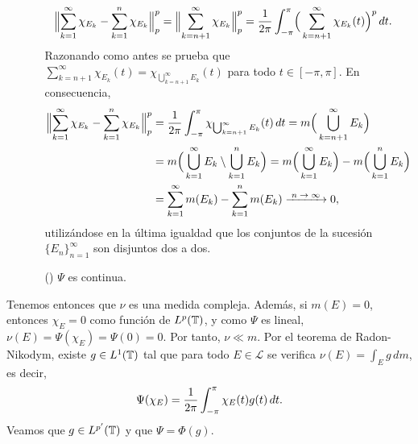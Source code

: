 \documentclass[a4paper, 12pt, oneside]{book}
\begin{document}
\begin{itemize}
\begin{itemize}
        \[
        \begin{aligned}[t]
            \Bigl\|\sum_{k=1}^\infty \chi_{E_k} - \sum_{k=1}^n \chi_{E_k}\Bigr\|_p^p &= \Bigl\|\sum_{k=n+1}^\infty \chi_{E_k}\Bigr\|_p^p = \frac{1}{2\pi}\int_{-\pi}^{\pi} \Bigl(\,\sum_{k=n+1}^\infty\chi_{E_k}(t)\Bigr)^p \, dt.
        \end{aligned}
        \]
        Razonando como antes se prueba que $\sum_{k=n+1}^\infty \chi_{E_k}(t) = \chi_{\bigcup_{k=n+1}^\infty E_k}(t)$ para todo $t \in [-\pi,\pi]$. En consecuencia,
        \[
        \begin{aligned}[t]
            \Bigl\|\sum_{k=1}^\infty \chi_{E_k} - \sum_{k=1}^n \chi_{E_k}\Bigr\|_p^p &= \frac{1}{2\pi}\integral{-\pi}{\pi}{\chi_{\bigcup_{k=n+1}^\infty E_k}(t)} = m\Bigl(\, \bigcup_{k=n+1}^\infty E_k\Bigr) \\
            &= m\Bigl(\, \bigcup_{k=1}^\infty E_k \setminus \bigcup_{k=1}^n E_k\Bigr) = m\Bigl(\,\bigcup_{k=1}^\infty E_k\Bigr) - m\Bigl(\,\bigcup_{k=1}^n E_k\Bigr) \\ &= \sum_{k=1}^\infty m(E_k) - \sum_{k=1}^n m(E_k) \nconv 0,
        \end{aligned}
        \]
        utilizándose en la última igualdad que los conjuntos de la sucesión $\{E_n\}_{n=1}^\infty$ son disjuntos dos a dos.
        \item[(\asts{3})] $\Psi$ es continua. 
    \end{itemize}
\end{itemize}

Tenemos entonces que $\nu$ es una medida compleja. Además, si $m(E) = 0$, entonces $\chi_E = 0$ como función de $L^p(\mathbb T)$, y como $\Psi$ es lineal, $\nu(E) = \Psi(\chi_E) = \Psi(0)= 0$. Por tanto, $\nu \ll m$. Por el teorema de Radon-Nikodym, existe $g \in L^1(\mathbb T)$ tal que para todo $E\in\mathcal{L}$ se verifica $\nu(E) =\int_E g\, dm$, es decir,
\[\Psi(\chi_E) = \frac{1}{2\pi}\int_{-\pi}^{\pi} \chi_E(t)g(t) \, dt.\]
Veamos que $g \in L^{p'}(\mathbb T)$ y que $\Psi = \Phi(g)$. 




\end{document}
